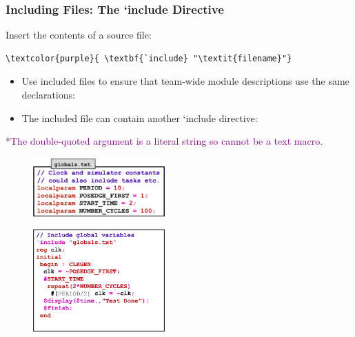 \documentclass[t, notes, xcolor=table]{beamer}
\begin{document}
\begin{frame}[fragile]
\frametitle{Including Files: The `include Directive}
\scriptsize{
\begin{multicols}{2}
Insert the contents of a source file:
\begin{Verbatim}[commandchars=\\\{\}, tabsize=2]
\textcolor{purple}{	\textbf{`include} "\textit{filename}"}
\end{Verbatim}
\begin{itemize}
\item Use included files to ensure that team-wide module descriptions use the same declarations:
\item The included file can contain another `include directive:
\end{itemize}
\vfill
\textcolor{purple}{*The double-quoted argument is a literal string so cannot be a text macro.}
\columnbreak
\begin{figure}
    \includegraphics[width=0.45\textwidth]{img/11_include1.png}
\end{figure}
\begin{figure}
    \includegraphics[width=0.45\textwidth]{img/11_include2.png}
\end{figure}
\end{multicols}
}

\end{frame}
\end{document}
